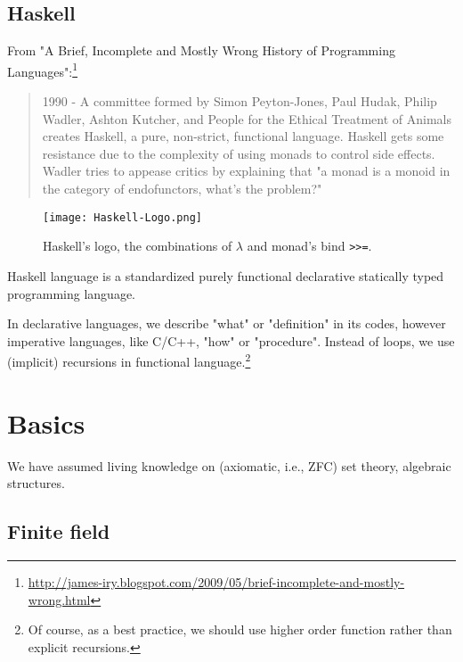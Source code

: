 \documentclass[11pt]{book}
\begin{document}
\section{Haskell}
From "A Brief, Incomplete and Mostly Wrong History of Programming Languages":\footnote{
\url{http://james-iry.blogspot.com/2009/05/brief-incomplete-and-mostly-wrong.html}
}
\begin{quotation}
1990 - A committee formed by Simon Peyton-Jones, Paul Hudak, Philip Wadler, Ashton Kutcher, and People for the Ethical Treatment of Animals creates Haskell, a pure, non-strict, functional language. Haskell gets some resistance due to the complexity of using monads to control side effects. Wadler tries to appease critics by explaining that "a monad is a monoid in the category of endofunctors, what's the problem?" 
\end{quotation}

\begin{figure}[htbp]
\begin{center}
\texttt{[image: Haskell-Logo.png]}
\caption{Haskell's logo, the combinations of $\lambda$ and monad's bind \texttt{>>=}.}
\label{Haskell-Logo}
\end{center}
\end{figure}

Haskell language is a standardized purely functional declarative statically typed programming language.

In declarative languages, we describe "what" or "definition" in its codes, however imperative languages, like C/C++, "how" or "procedure".
Instead of loops, we use (implicit) recursions in functional language.\footnote{Of course, as a best practice, we should use higher order function rather than explicit recursions.
}


\chapter{Basics}
We have assumed living knowledge on (axiomatic, i.e., ZFC) set theory, algebraic structures.

\section{Finite field}
\end{document}
